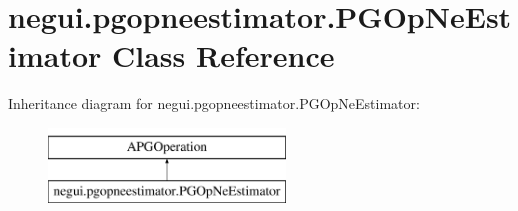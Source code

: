 \hypertarget{classnegui_1_1pgopneestimator_1_1PGOpNeEstimator}{}\section{negui.\+pgopneestimator.\+P\+G\+Op\+Ne\+Estimator Class Reference}
\label{classnegui_1_1pgopneestimator_1_1PGOpNeEstimator}
Inheritance diagram for negui.\+pgopneestimator.\+P\+G\+Op\+Ne\+Estimator\+:\begin{figure}[H]
\begin{center}
\leavevmode
\includegraphics[height=2.000000cm]{classnegui_1_1pgopneestimator_1_1PGOpNeEstimator}
\end{center}
\end{figure}
